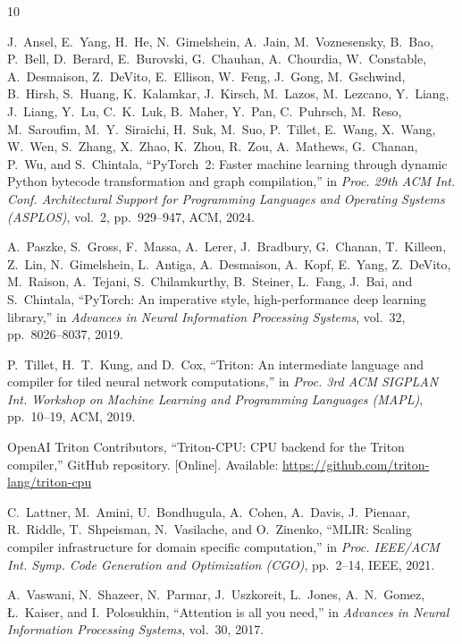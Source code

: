 \documentclass[conference]{IEEEtran}
\begin{document}
\begin{thebibliography}{10}

J.~Ansel, E.~Yang, H.~He, N.~Gimelshein, A.~Jain, M.~Voznesensky,
B.~Bao, P.~Bell, D.~Berard, E.~Burovski, G.~Chauhan, A.~Chourdia,
W.~Constable, A.~Desmaison, Z.~DeVito, E.~Ellison, W.~Feng, J.~Gong,
M.~Gschwind, B.~Hirsh, S.~Huang, K.~Kalamkar, J.~Kirsch, M.~Lazos,
M.~Lezcano, Y.~Liang, J.~Liang, Y.~Lu, C.~K.~Luk, B.~Maher,
Y.~Pan, C.~Puhrsch, M.~Reso, M.~Saroufim, M.~Y.~Siraichi,
H.~Suk, M.~Suo, P.~Tillet, E.~Wang, X.~Wang, W.~Wen, S.~Zhang,
X.~Zhao, K.~Zhou, R.~Zou, A.~Mathews, G.~Chanan, P.~Wu, and
S.~Chintala,
``PyTorch~2: Faster machine learning through dynamic Python bytecode
transformation and graph compilation,''
in \emph{Proc. 29th ACM Int. Conf. Architectural Support for
Programming Languages and Operating Systems (ASPLOS)}, vol.~2,
pp.~929--947, ACM, 2024.

A.~Paszke, S.~Gross, F.~Massa, A.~Lerer, J.~Bradbury, G.~Chanan,
T.~Killeen, Z.~Lin, N.~Gimelshein, L.~Antiga, A.~Desmaison,
A.~Kopf, E.~Yang, Z.~DeVito, M.~Raison, A.~Tejani, S.~Chilamkurthy,
B.~Steiner, L.~Fang, J.~Bai, and S.~Chintala,
``PyTorch: An imperative style, high-performance deep learning library,''
in \emph{Advances in Neural Information Processing Systems},
vol.~32, pp.~8026--8037, 2019.

P.~Tillet, H.~T.~Kung, and D.~Cox,
``Triton: An intermediate language and compiler for tiled neural network
computations,''
in \emph{Proc. 3rd ACM SIGPLAN Int. Workshop on Machine Learning and
Programming Languages (MAPL)}, pp.~10--19, ACM, 2019.

OpenAI Triton Contributors,
``Triton-CPU: CPU backend for the Triton compiler,''
GitHub repository.
[Online]. Available: \url{https://github.com/triton-lang/triton-cpu}

C.~Lattner, M.~Amini, U.~Bondhugula, A.~Cohen, A.~Davis, J.~Pienaar,
R.~Riddle, T.~Shpeisman, N.~Vasilache, and O.~Zinenko,
``MLIR: Scaling compiler infrastructure for domain specific
computation,''
in \emph{Proc. IEEE/ACM Int. Symp. Code Generation and Optimization
(CGO)}, pp.~2--14, IEEE, 2021.

A.~Vaswani, N.~Shazeer, N.~Parmar, J.~Uszkoreit, L.~Jones,
A.~N.~Gomez, \L.~Kaiser, and I.~Polosukhin,
``Attention is all you need,''
in \emph{Advances in Neural Information Processing Systems},
vol.~30, 2017.


\end{thebibliography}
\end{document}
